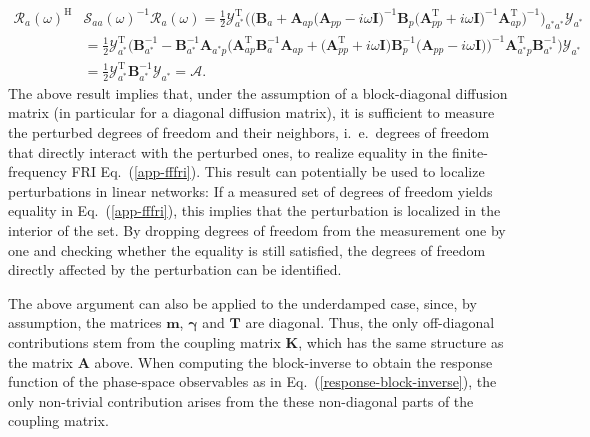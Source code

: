 \documentclass[aps,pre,twocolumn,superscriptaddress,notitlepage]{revtex4-2}
\newcommand{\nn}{\nonumber \\}
\newcommand{\n}{\nonumber}
\newcommand{\bmc}[1]{\bm{\mathcal{#1}}}
\renewcommand{\eqref}[1]{Eq.~(\ref{#1})}
\begin{document}
\begin{align}
\bmc{R}_a(\omega)^\text{H} &\bmc{S}_{aa}(\omega)^{-1} \bmc{R}_a(\omega) = \frac{1}{2} \bmc{Y}_{a^*}^\text{T} \bigg( \Big( \bm{B}_a + \bm{A}_{ap} \big(\bm{A}_{pp} - i \omega \bm{I} \big)^{-1} \bm{B}_p \big(\bm{A}_{pp}^\text{T} + i \omega \bm{I} \big)^{-1} \bm{A}_{ap}^\text{T} \Big)^{-1} \bigg)_{a^* a^*} \bmc{Y}_{a^*} \\
&= \frac{1}{2} \bmc{Y}_{a^*}^\text{T} \Big( \bm{B}_{a^*}^{-1} - \bm{B}_{a^*}^{-1} \bm{A}_{a^*p} \Big( \bm{A}_{ap}^\text{T} \bm{B}_a^{-1} \bm{A}_{ap} + \big(\bm{A}_{pp}^\text{T} + i \omega \bm{I} \big) \bm{B}_p^{-1} \big(\bm{A}_{pp} - i \omega \bm{I} \big) \Big)^{-1}  \bm{A}_{a^*p}^\text{T} \bm{B}_{a^*}^{-1} \Big) \bmc{Y}_{a^*}  \nn
&= \frac{1}{2} \bmc{Y}_{a^*}^\text{T} \bm{B}_{a^*}^{-1} \bmc{Y}_{a^*} = \bmc{A} \n .
\end{align}
The above result implies that, under the assumption of a block-diagonal diffusion matrix (in particular for a diagonal diffusion matrix), it is sufficient to measure the perturbed degrees of freedom and their neighbors, i.~e.~degrees of freedom that directly interact with the perturbed ones, to realize equality in the finite-frequency FRI \eqref{app-fffri}.
This result can potentially be used to localize perturbations in linear networks:
If a measured set of degrees of freedom yields equality in \eqref{app-fffri}, this implies that the perturbation is localized in the interior of the set.
By dropping degrees of freedom from the measurement one by one and checking whether the equality is still satisfied, the degrees of freedom directly affected by the perturbation can be identified.

The above argument can also be applied to the underdamped case, since, by assumption, the matrices $\bm{m}$, $\bm{\gamma}$ and $\bm{T}$ are diagonal.
Thus, the only off-diagonal contributions stem from the coupling matrix $\bm{K}$, which has the same structure as the matrix $\bm{A}$ above.
When computing the block-inverse to obtain the response function of the phase-space observables as in \eqref{response-block-inverse}, the only non-trivial contribution arises from the these non-diagonal parts of the coupling matrix.
\end{document}
